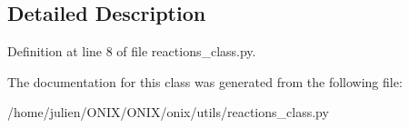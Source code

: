 \subsection{Detailed Description}


Definition at line 8 of file reactions\+\_\+class.\+py.



The documentation for this class was generated from the following file\+:\begin{DoxyCompactItemize}
\item 
/home/julien/\+O\+N\+I\+X/\+O\+N\+I\+X/onix/utils/reactions\+\_\+class.\+py\end{DoxyCompactItemize}
